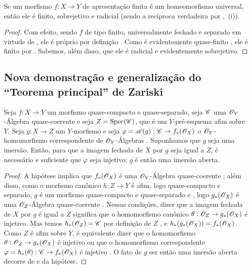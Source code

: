 \begin{proposition}[8.11.6]
\label{IV.8.11.6}
Se um morfismo $f:X\to Y$ de apresentação finita é um homeomorfismo universal, então ele é finito, sobrejetivo e radicial (sendo a recíproca verdadeira por ,~(i)).
\end{proposition}

\begin{proof}
Com efeito, sendo $f$ de tipo finito, universalmente fechado e separado em virtude de , ele é próprio por definição .
Como é evidentemente quase-finito , ele é finito por .
Sabemos, além disso, que ele é radicial  e evidentemente sobrejetivo.
\end{proof}

\subsection{Nova demonstração e generalização do ``Teorema principal'' de Zariski}
\label{subsection:IV.8.12}
\label{IV.8.12}

\begin{lemma}[8.12.1]
\label{IV.8.12.1}
Seja $f:X\to Y$ um morfismo quase-compacto e quase-separado, seja $\mathscr{C}$ uma $\mathscr{O}_Y$-Álgebra quase-coerente e seja $Z=\operatorname{Spec}(\mathscr{C})$, que é um $Y$-pré-esquema afim sobre $Y$.
Seja $g:X\to Z$ um $Y$-morfismo e seja $\varphi=\sh{A}(g):\sh{C}\to f_*(\sh{O}_X)$ o $\mathscr{O}_Y$-homomorfismo correspondente de $\mathscr{O}_Y$-Álgebras .
Suponhamos que $g$ seja uma imersão.
Então, para que a imagem fechada de $X$ por $g$  seja igual a $Z$, é necessário e suficiente que $\varphi$ seja injetivo; $g$ é então uma imersão aberta.
\end{lemma}

\begin{proof}
A hipótese implica que $f_*(\mathscr{O}_X)$ é uma $\mathscr{O}_Y$-Álgebra quase-coerente ; além disso, como o morfismo canônico $h:Z\to Y$ é afim, logo quase-compacto e separado, $g$ é um morfismo quase-compacto e quase-separado  e , logo $g_*(\mathscr{O}_X)$ é uma $\mathscr{O}_Z$-Álgebra quase-coerente .
Nessas condições, dizer que a imagem fechada de $X$ por $g$ é igual a $Z$ significa  que o homomorfismo canônico $\theta:\sh{O}_Z\to g_*(\sh{O}_X)$ é injetivo.
Mas temos $h_*(\mathscr{O}_Z)=\mathscr{C}$ por definição de $Z$ , e $h_*(g_*(\mathscr{O}_X))=f_*(\mathscr{O}_X)$.
Como $Z$ é afim sobre $Y$, é equivalente dizer que o homomorfismo $\theta:\sh{O}_Z\to g_*(\sh{O}_X)$ é injetivo ou que o homomorfismo correspondente $\varphi=h_*(\theta):\sh{C}\to f_*(\sh{O}_X)$ é injetivo .
O fato de $g$ ser então uma imersão aberta decorre de  e da hipótese.
\end{proof}

